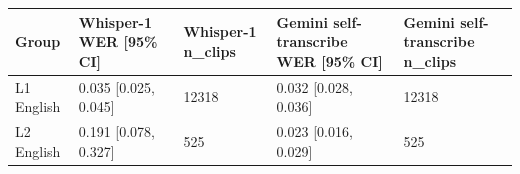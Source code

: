 \begin{tabular}{lllll}
\toprule
Group & Whisper-1 WER [95\% CI] & Whisper-1 n\_clips & Gemini self-transcribe WER [95\% CI] & Gemini self-transcribe n\_clips \\
\midrule
L1 English & 0.035 [0.025, 0.045] & 12318 & 0.032 [0.028, 0.036] & 12318 \\
L2 English & 0.191 [0.078, 0.327] & 525 & 0.023 [0.016, 0.029] & 525 \\
\bottomrule
\end{tabular}

